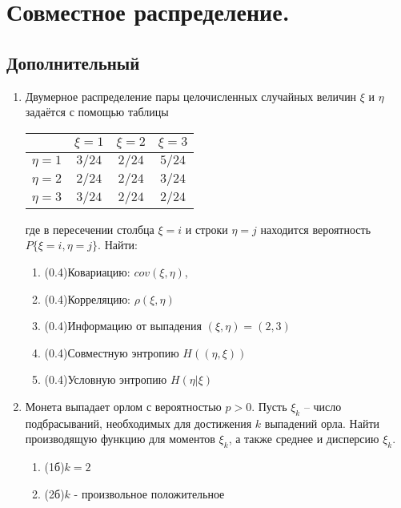 \documentclass[a4paper, 14pt]{extarticle}
\begin{document}
\newpage
\section*{Совместное распределение.}
\subsection*{Дополнительный}

\begin{enumerate}
   \item 
Двумерное распределение пары целочисленных случайных величин $\xi$ и $\eta$ задаётся с помощью таблицы

\begin{center}
\begin{tabular}{|c|c|c|c|}
\hline
 & $\xi = 1$ & $\xi = 2$ & $\xi = 3$\\
\hline
$\eta = 1$ & $3/24$ & $2/24$ & $5/24$\\ 
\hline
$\eta =2$ & $2/24$ & $2/24$ & $3/24$\\ 
\hline
$\eta = 3$ & $3/24$ & $2/24$ & $2/24$\\ 

\hline
\end{tabular}

\end{center}
где в пересечении столбца $\xi = i$ и строки $\eta = j$ находится вероятность $P\lbrace{\xi = i, \eta = j\rbrace}$. Найти:

\begin{enumerate}
    \item (0.4)Ковариацию: $cov(\xi, \eta) $,
    \item (0.4)Корреляцию: $\rho(\xi, \eta)$
    \item (0.4)Информацию от выпадения $(\xi,\eta)=(2,3)$
    \item (0.4)Совместную энтропию $H((\eta, \xi))$
    \item (0.4)Условную энтропию $H(\eta|\xi)$
\end{enumerate}
\item Монета выпадает орлом с вероятностью $p>0$. Пусть $\xi_k$ -- число подбрасываний, необходимых для достижения $k$ выпадений орла. Найти производящую функцию для моментов $\xi_k$, а также среднее и дисперсию $\xi_k$. 
\begin{enumerate}
    \item (1б)$k=2$
    \item (2б)$k$ - произвольное положительное
\end{enumerate}


\end{enumerate}
\end{document}
